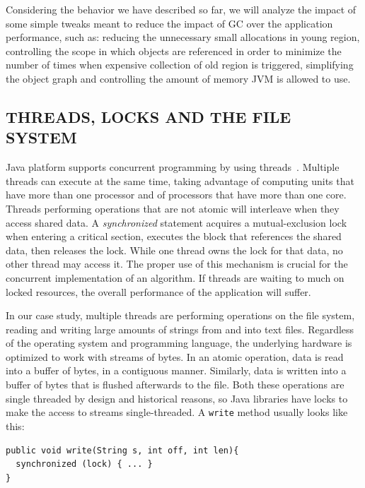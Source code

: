 \documentclass[a4paper,twoside]{article}
\begin{document}
Considering the behavior we have described so far, we will analyze the impact of some simple tweaks
meant to reduce the impact of GC over the application performance, such as:
reducing the unnecessary small allocations in young region, controlling the scope in which objects are referenced in order to minimize the number of times when expensive collection of old region is triggered, simplifying the object graph and controlling the amount of memory JVM is allowed to use.




\subsection{\uppercase{Threads, Locks and the File System}}
\label{background:threads}

Java platform supports concurrent programming by using threads~\cite{gosling:2014}.
Multiple threads can execute at the same time, taking advantage of computing units that have more than one processor and of processors that have more than one core.
Threads performing operations that are not atomic will interleave when they access shared data.
A {\textit{synchronized}} statement acquires a mutual-exclusion lock when entering a critical section, executes the block that references the shared data, then releases the lock.
While one thread owns the lock for that data, no other thread may access it. 
The proper use of this mechanism is crucial for the concurrent implementation of an algorithm.
If threads are waiting to much on locked resources, the overall performance of the application will suffer.

In our case study, multiple threads are performing operations on the file system, reading and writing large amounts of strings from and into text files.
Regardless of the operating system and programming language, the underlying hardware is optimized to work with streams of bytes.
In an atomic operation, data is read into a buffer of bytes, in a contiguous manner.
Similarly, data is written into a buffer of bytes that is flushed afterwards to the file.
Both these operations are single threaded by design and historical reasons, so Java libraries have locks to make the access to streams single-threaded.
A \texttt{write} method usually looks like this:
\begin{small}
\begin{verbatim}
public void write(String s, int off, int len){
  synchronized (lock) { ... }
}
\end{verbatim}
\end{small}
\end{document}

